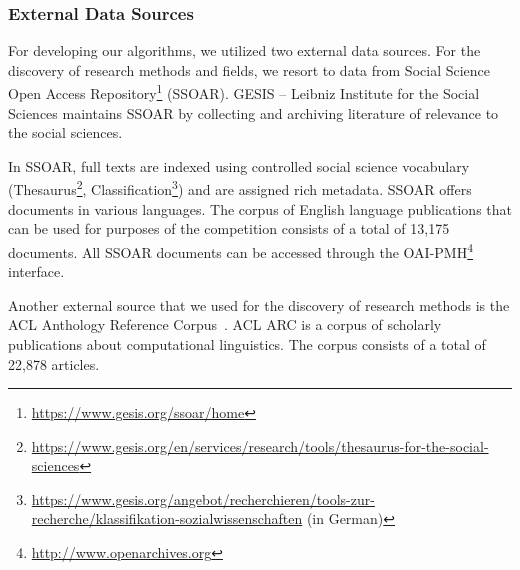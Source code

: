 \subsubsection{External Data Sources}
\label{sec:external_data_sources}
For developing our algorithms, we utilized two external data sources. For the discovery of research methods and fields, we resort to data from Social Science Open Access Repository\footnote{\url{https://www.gesis.org/ssoar/home}} (SSOAR). 
GESIS – Leibniz Institute for the Social Sciences maintains  SSOAR by collecting and archiving literature of relevance to the social sciences. 

In SSOAR, full texts are indexed using controlled social science vocabulary (Thesaurus\footnote{\url{https://www.gesis.org/en/services/research/tools/thesaurus-for-the-social-sciences}}, Classification\footnote{\url{https://www.gesis.org/angebot/recherchieren/tools-zur-recherche/klassifikation-sozialwissenschaften} (in German)}) and are assigned rich metadata. SSOAR offers documents in various languages. The corpus of English language publications that can be used for purposes of the competition consists of a total of 13,175 documents. All SSOAR documents can be accessed through the OAI-PMH\footnote{{\url{http://www.openarchives.org}}} interface. 

Another external source that we used for the discovery of research methods is the ACL Anthology Reference Corpus~\cite{bird2008acl}. ACL ARC is a corpus of scholarly publications about computational linguistics.  
The corpus consists of a total of 22,878 articles.


